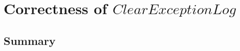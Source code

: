 \chapter[$ClearExceptionLog$]{Correctness of $ClearExceptionLog$}\label{ch22}

\newpage
\section{Summary}\label{ch22.summary}

\ldefsummary %
\lthmsummary %
\lthmaddeddefsummary %
\lthmaddedthmsummary %
\lzevessummary %
